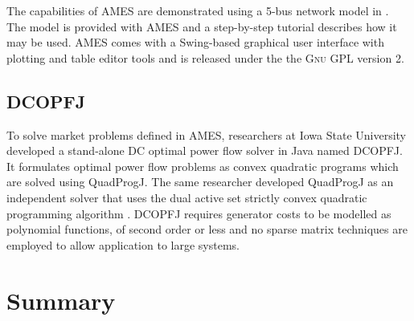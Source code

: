 The capabilities of AMES are demonstrated using a 5-bus network model in
.  The model is provided with AMES and a step-by-step
tutorial describes how it may be used.  AMES comes with a
Swing-based graphical user interface with plotting and table editor tools and
is released under the the \textsc{Gnu} GPL version 2.

\subsection*{DCOPFJ}
\label{sec:dcopfj}
To solve market problems defined in AMES, researchers at Iowa State University
developed a stand-alone DC optimal power flow solver in Java named DCOPFJ.
It formulates optimal power flow problems as convex quadratic programs
which are solved using QuadProgJ.  The same researcher developed QuadProgJ as
an independent solver that uses the dual active set strictly convex quadratic
programming algorithm \cite{goldfarb:scqp}.  DCOPFJ requires
generator costs to be modelled as polynomial functions, of second order or
less and no sparse matrix techniques are employed to allow application to large
systems.

\section{Summary}
